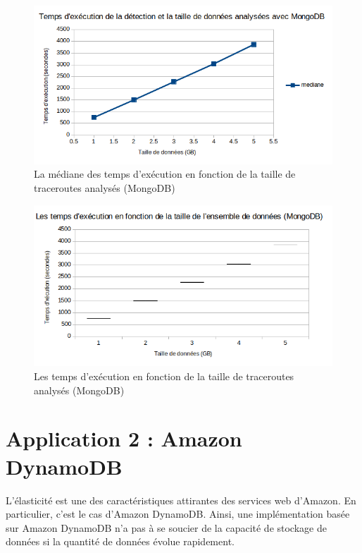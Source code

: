 \begin{figure}[H]
	\centering
	\captionsetup{justification=centering}
	\includegraphics[width=0.7\linewidth]{illustrations/mongoDBtiming_0}
	\caption{La médiane des temps d'exécution en fonction de la taille de traceroutes analysés (MongoDB)}
	\label{fig:mongodbtiming}
\end{figure}


\begin{figure}[H]
	\centering
		\captionsetup{justification=centering}
	\includegraphics[width=0.7\linewidth]{illustrations/moustacheMongodb_0}
	\caption{Les temps d'exécution en fonction de la taille de traceroutes analysés (MongoDB)}
	\label{fig:moustachemongodb}
\end{figure}






\section{Application 2 : Amazon DynamoDB}




L'élasticité est une des caractéristiques attirantes des services web d'Amazon. En particulier, c'est le cas d'Amazon DynamoDB. Ainsi, une implémentation basée sur Amazon DynamoDB  n'a pas à se soucier de la capacité  de stockage de données si la quantité de données évolue rapidement. 

